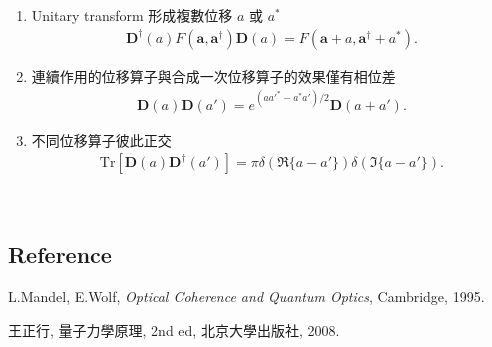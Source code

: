 \documentclass[pop,reprint]{revtex4-1}
\begin{document}
\begin{enumerate}
\item Unitary transform 形成複數位移 $ a $ 或 $ a^* $
\begin{eqnarray}
\bm{D}^\dag(a)F(\bm{a},\bm{a}^\dag)\bm{D}(a)=F(\bm{a}+a,\bm{a}^\dag+a^*).
\end{eqnarray}
\item 連續作用的位移算子與合成一次位移算子的效果僅有相位差
\begin{eqnarray}
\bm{D}(a)\bm{D}(a')=e^{(aa'^*-a^*a')/2}\bm{D}(a+a').
\end{eqnarray}
\item 不同位移算子彼此正交
\begin{eqnarray}
\mbox{Tr}[\bm{D}(a)\bm{D}^\dag(a')]=\pi\delta(\Re\{a-a'\})\delta(\Im\{a-a'\}).
\end{eqnarray}
\end{enumerate}
~\\

\subsection*{Reference}

\begin{footnotesize}
[1] L.Mandel, E.Wolf, \textsl{Optical Coherence and Quantum Optics}, Cambridge, 1995.

\noindent[2] 王正行, 量子力學原理, 2nd ed, 北京大學出版社, 2008.
\end{footnotesize}
\end{document}
